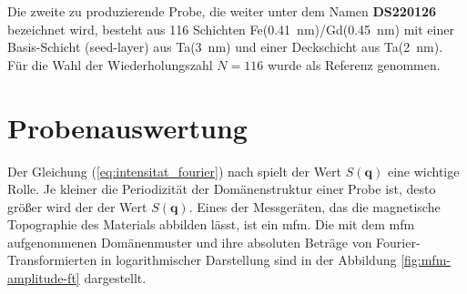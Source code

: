 \noindent
Die zweite zu produzierende Probe, die weiter unter dem Namen \textbf{DS220126} bezeichnet wird, besteht aus 116 Schichten Fe(\SI{0.41}{\nano\meter})/Gd(\SI{0.45}{\nano\meter}) mit einer Basis-Schicht (seed-layer) aus
Ta(\SI{3}{\nano\meter}) und einer Deckschicht aus Ta(\SI{2}{\nano\meter}). Für die Wahl der Wiederholungszahl $N=116$ wurde \cite[Abschnitt „Sample Preparation“]{tripathi_dichroic_2011} als Referenz genommen.

\section{Probenauswertung}
Der Gleichung (\ref{eq:intensitat_fourier}) nach spielt der Wert $S(\mathbf{q})$ eine wichtige Rolle. Je kleiner die Periodizität der Domänenstruktur einer Probe ist, desto größer wird der der Wert $S(\mathbf{q})$. Eines der Messgeräten, das die magnetische Topographie des Materials abbilden lässt, ist ein \gls{mfm}. Die mit dem \gls{mfm} aufgenommenen Domänenmuster und ihre absoluten Beträge von Fourier-Transformierten in logarithmischer Darstellung sind in der Abbildung \ref{fig:mfm-amplitude-ft} dargestellt.
